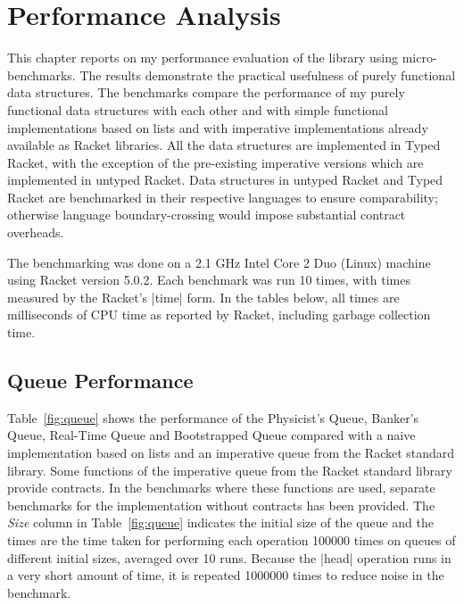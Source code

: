 \chapter{Performance Analysis}
\label{chap:four}
This chapter reports on my performance evaluation of the library using
micro-benchmarks. The results demonstrate the practical usefulness of
purely functional data structures. The benchmarks compare the
performance of my purely functional data structures with each other and
with simple functional implementations based on lists and with
imperative implementations already available as Racket libraries. All
the data structures are implemented in Typed Racket, with the exception
of the pre-existing imperative versions which are implemented in untyped
Racket. Data structures in untyped Racket and Typed Racket are
benchmarked in their respective languages to ensure comparability;
otherwise language boundary-crossing would impose substantial contract
overheads.

The benchmarking was done on a 2.1 GHz Intel Core 2 Duo (Linux) machine
using Racket version 5.0.2. Each benchmark was run 10 times, with times
measured by the Racket's \scheme|time| form. In the tables below, all
times are milliseconds of CPU time as reported by Racket, including garbage
collection time.%


\section{Queue Performance}


Table~\ref{fig:queue} shows the performance of the Physicist's Queue,
Banker's Queue, Real-Time Queue and Bootstrapped Queue compared with a
naive implementation based on lists and an imperative queue from the
Racket standard library. Some functions of the imperative queue from the
Racket standard library provide contracts. In the benchmarks where these
functions are used, separate benchmarks for the implementation without
contracts has been provided. The \emph{Size} column in
Table~\ref{fig:queue} indicates the initial size of the queue and the
times are the time taken for performing each operation 100000 times on
queues of different initial sizes, averaged over 10 runs. Because the
\scheme|head| operation runs in a very short amount of time, it is
repeated 1000000 times to reduce noise in the benchmark.

